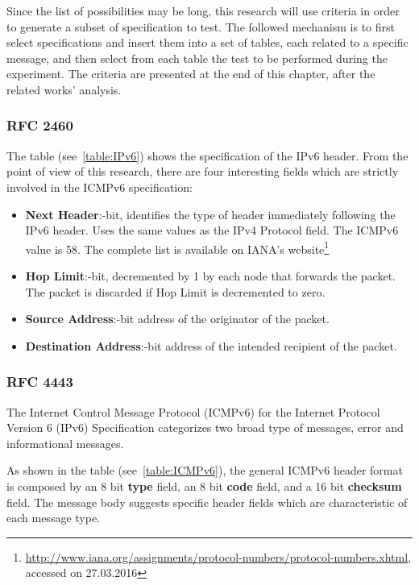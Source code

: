 \documentclass[12pt]{article}
\begin{document}
Since the list of possibilities may be long, this research will use criteria in order to generate a subset of specification to test. The followed mechanism is to first select specifications and insert them into a set of tables, each related to a specific message, and then select from each table the test to be performed during the experiment. The criteria are presented at the end of this chapter, after the related works' analysis.

\pagebreak

\subsubsection{RFC 2460}
\label{subsub:2460}
The table (see~\ref{table:IPv6}) shows the specification of the IPv6 header. From the point of view of this research, there are four interesting fields which are strictly involved in the ICMPv6 specification:
\vspace{-15pt}
\begin{itemize}[noitemsep,topsep=0pt,partopsep=0pt]
 \item \textbf{Next Header}:-bit, identifies the type of header immediately following the IPv6 header. Uses the same values as the IPv4 Protocol field. The ICMPv6 value is 58. The complete list is available on IANA's website\footnote{\url{http://www.iana.org/assignments/protocol-numbers/protocol-numbers.xhtml}, accessed on 27.03.2016}
 \item \textbf{Hop Limit}:-bit, decremented by 1 by each node that forwards the packet. The packet is discarded if Hop Limit is decremented to zero.
 \item \textbf{Source Address}:-bit address of the originator of the packet.
 \item \textbf{Destination Address}:-bit address of the intended recipient of the packet.
\end{itemize}


\subsubsection{RFC 4443}
\label{subsub:4443}

The Internet Control Message Protocol (ICMPv6) for the Internet Protocol Version 6 (IPv6) Specification categorizes two broad type of messages, error and informational messages.

As shown in the table (see~\ref{table:ICMPv6}), the general ICMPv6 header format is composed by an 8 bit \textbf{type} field, an 8 bit \textbf{code} field, and a 16 bit \textbf{checksum} field. The message body suggests specific header fields which are characteristic of each message type.
\end{document}
